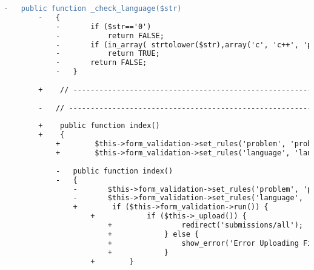 \begin{lstlisting}[language=diff, caption=Perubahan pada kode Submit.php]
		-	public function _check_language($str)
		-	{
			-		if ($str=='0')
			-			return FALSE;
			-		if (in_array( strtolower($str),array('c', 'c++', 'python 2', 'python 3', 'java', 'zip', 'pdf', 'txt')))
			-			return TRUE;
			-		return FALSE;
			-	}
		
		+    // ------------------------------------------------------------------------
		
		-	// ------------------------------------------------------------------------
		
		+    public function index()
		+    {
			+        $this->form_validation->set_rules('problem', 'problem', 'required|integer|greater_than[0]', array('greater_than' => 'Select a %s.'));
			+        $this->form_validation->set_rules('language', 'language', 'required|callback__check_language', array('_check_language' => 'Select a valid %s.'));
			
			-	public function index()
			-	{
				-		$this->form_validation->set_rules('problem', 'problem', 'required|integer|greater_than[0]', array('greater_than' => 'Select a %s.'));
				-		$this->form_validation->set_rules('language', 'language', 'required|callback__check_language', array('_check_language' => 'Select a valid %s.'));
				+        if ($this->form_validation->run()) {
					+            if ($this->_upload()) {
						+                redirect('submissions/all');
						+            } else {
						+                show_error('Error Uploading File: '.$this->upload->display_errors());
						+            }
					+        }
				

\end{lstlisting}
